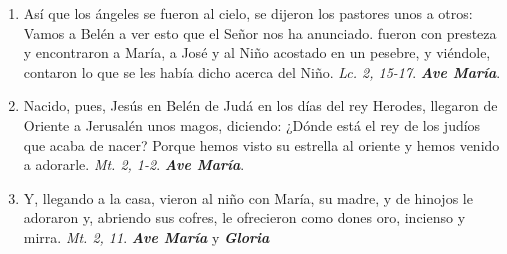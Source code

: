 \documentclass[../../devocionario.tex]{subfiles}
\begin{document}
\begin{enumerate}
        \item Así que los ángeles se fueron al cielo, se dijeron los pastores unos a otros: Vamos a Belén a ver esto que el Señor nos ha anunciado. fueron
            con presteza y encontraron a María, a José y al Niño acostado en un pesebre, y viéndole, contaron lo que se les había dicho acerca del
            Niño. \textit{Lc. 2, 15-17}. \textbf{\textit{Ave María}}.   

        \item Nacido, pues, Jesús en Belén de Judá en los días del rey Herodes, llegaron de Oriente a Jerusalén unos magos, diciendo: ¿Dónde está el rey de los judíos
            que acaba de nacer? Porque hemos visto su estrella al oriente y hemos venido a adorarle. \textit{Mt. 2, 1-2}. \textbf{\textit{Ave María}}.            
        
        \item Y, llegando a la casa, vieron al niño con María, su madre, y de hinojos le adoraron y, abriendo sus cofres, le ofrecieron como dones oro, incienso y mirra. 
            \textit{Mt. 2, 11}. \textbf{\textit{Ave María}} y \textbf{\textit{Gloria}}
    
    \end{enumerate}
\end{document}
